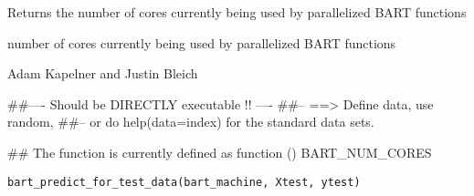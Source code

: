 \documentclass[a4paper]{book}
\begin{document}
%
\begin{Details}\relax
Returns the number of cores currently being used by parallelized BART functions
\end{Details}
%
\begin{Value}


\begin{ldescription}
\item[\code{BART\_NUM\_CORES}] number of cores currently being used by parallelized BART functions
\end{ldescription}


\end{Value}
%
\begin{Author}\relax
Adam Kapelner and Justin Bleich
\end{Author}
%
\begin{Examples}
\begin{ExampleCode}
##---- Should be DIRECTLY executable !! ----
##-- ==>  Define data, use random,
##--	or do  help(data=index)  for the standard data sets.

## The function is currently defined as
function () 
{
    BART_NUM_CORES
  }
\end{ExampleCode}
\end{Examples}
%
\begin{Usage}
\begin{verbatim}
bart_predict_for_test_data(bart_machine, Xtest, ytest)
\end{verbatim}
\end{Usage}
%
\begin{Arguments}
\begin{ldescription}
\item[\code{bart\_machine}] 


\item[\code{Xtest}] 


\item[\code{ytest}] 


\end{ldescription}
\end{Arguments}
%
\end{document}
